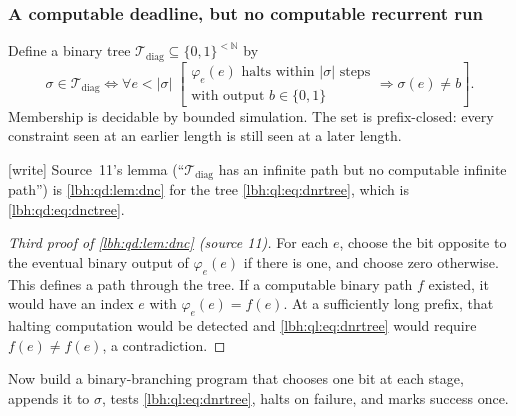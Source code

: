 \documentclass[11pt,letterpaper]{article}
\theoremstyle{definition}
\theoremstyle{remark}
\newcommand{\N}{\mathbb N}
\newcommand{\1}{\mathbf 1}
\newcommand{\T}{\mathcal T}
\newcommand{\wtag}{\textup{[write]}}%
\begin{document}
\subsubsection{A computable deadline, but no computable recurrent run}
Define a binary tree $\T_{\mathrm{diag}}\subseteq\{0,1\}^{<\N}$ by
\begin{equation}\label{lbh:ql:eq:dnrtree}
 \sigma\in\T_{\mathrm{diag}}
 \iff
 \forall e<|\sigma|\;
 \left[
 \begin{array}{l}
 \varphi_e(e)\text{ halts within }|\sigma|\text{ steps}\\[-1pt]
 \text{with output }b\in\{0,1\}
 \end{array}
 \Longrightarrow \sigma(e)\neq b\right].
\end{equation}
Membership is decidable by bounded simulation. The set is prefix-closed:
every constraint seen at an earlier length is still seen at a later length.

\wtag{} Source~11's lemma (``$\T_{\mathrm{diag}}$ has an infinite path but no computable infinite
path'') is \cref{lbh:qd:lem:dnc} for the tree \eqref{lbh:ql:eq:dnrtree}, which is
\eqref{lbh:qd:eq:dnctree}.
\begin{proof}[Third proof of \cref{lbh:qd:lem:dnc} (source 11)]
For each $e$, choose the bit opposite to the eventual binary output of
$\varphi_e(e)$ if there is one, and choose zero otherwise. This defines a
path through the tree. If a computable binary path $f$ existed, it would have
an index $e$ with $\varphi_e(e)=f(e)$. At a sufficiently long prefix, that
halting computation would be detected and \eqref{lbh:ql:eq:dnrtree} would require
$f(e)\neq f(e)$, a contradiction.
\end{proof}
Now build a binary-branching program that chooses one bit at each stage,
appends it to $\sigma$, tests \eqref{lbh:ql:eq:dnrtree}, halts on failure, and marks
success once.
\end{document}
